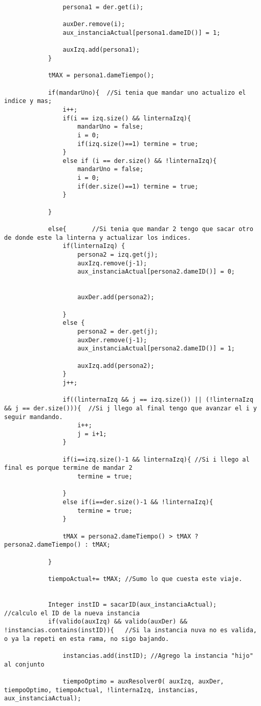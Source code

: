 \begin{lstlisting}
				persona1 = der.get(i);

				auxDer.remove(i);
				aux_instanciaActual[persona1.dameID()] = 1;
				
				auxIzq.add(persona1);
			}

			tMAX = persona1.dameTiempo();

			if(mandarUno){	//Si tenia que mandar uno actualizo el indice y mas;
				i++;
				if(i == izq.size() && linternaIzq){
					mandarUno = false;
					i = 0;
					if(izq.size()==1) termine = true;
				}
				else if (i == der.size() && !linternaIzq){
					mandarUno = false;
					i = 0;
					if(der.size()==1) termine = true;
				}

			}

			else{		//Si tenia que mandar 2 tengo que sacar otro de donde este la linterna y actualizar los indices.
				if(linternaIzq) {
					persona2 = izq.get(j);
					auxIzq.remove(j-1);
					aux_instanciaActual[persona2.dameID()] = 0;

					
					auxDer.add(persona2);
					
				}
				else {
					persona2 = der.get(j);
					auxDer.remove(j-1);
					aux_instanciaActual[persona2.dameID()] = 1;
					
					auxIzq.add(persona2);
				}
				j++;

				if((linternaIzq && j == izq.size()) || (!linternaIzq && j == der.size())){	//Si j llego al final tengo que avanzar el i y seguir mandando.
					i++;
					j = i+1;
				}

				if(i==izq.size()-1 && linternaIzq){	//Si i llego al final es porque termine de mandar 2
					termine = true;

				}
				else if(i==der.size()-1 && !linternaIzq){
					termine = true;
				}

				tMAX = persona2.dameTiempo() > tMAX ? persona2.dameTiempo() : tMAX;

			}

			tiempoActual+= tMAX; //Sumo lo que cuesta este viaje.
			
			
			Integer instID = sacarID(aux_instanciaActual);			//calculo el ID de la nueva instancia				
			if(valido(auxIzq) && valido(auxDer) && !instancias.contains(instID)){	//Si la instancia nuva no es valida, o ya la repeti en esta rama, no sigo bajando.
			
				instancias.add(instID);	//Agrego la instancia "hijo" al conjunto 
				
				tiempoOptimo = auxResolver0( auxIzq, auxDer, tiempoOptimo, tiempoActual, !linternaIzq, instancias, aux_instanciaActual);
				

\end{lstlisting}
